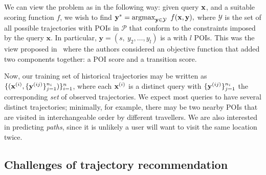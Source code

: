 We can view the {\trajrec} problem as {\seqrec} in the following way:
given {\trajectory} query $\mathbf{x}$, and a suitable scoring function $f$, we wish to find
$\mathbf{y}^* = \operatorname*{argmax}_{\mathbf{y} \in \mathcal{Y}}~f(\mathbf{x}, \mathbf{y}),$
where $\mathcal{Y}$ is the set of all possible trajectories with POIs in $\mathcal{P}$ that conform to the constraints imposed by the query $\mathbf{x}$.
In particular,
$\mathbf{y} = (s,~ y_2, \dots, y_l)$ is a {\trajectory} with $l$ POIs. %
This was the view proposed in~\cite{cikm16paper} where the authors considered an
objective function that added two components together: a POI score and a transition score.

Now, our training set of historical trajectories may be written as
$\{ ( \mathbf{x}^{({i})}, \{ \mathbf{y}^{({ij})} \}_{j=1}^{n_i} ) \}_{i=1}^{n}$,
where each $\mathbf{x}^{({i})}$ is a distinct query
with $\{ \mathbf{y}^{({ij})} \}_{j=1}^{n_i}$ the corresponding \emph{set} of observed trajectories.
We expect most queries to have several distinct trajectories;
minimally,
for example,
there may be two nearby POIs that are visited in interchangeable order by different travellers.
We are also interested in predicting \emph{paths}, %
since it is unlikely a user will want to visit the same location twice.




\subsection{Challenges of trajectory recommendation}

